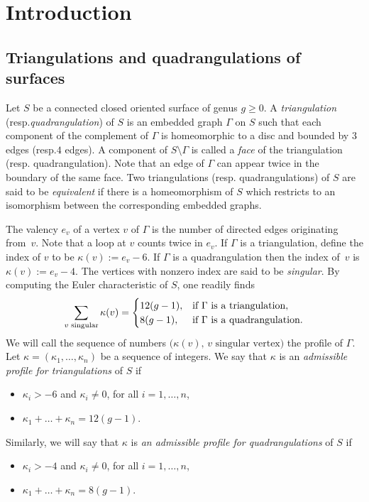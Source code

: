 \documentclass[11pt]{article}
\newcommand{\resp}{resp.\xspace}
\numberwithin{equation}{section}
\theoremstyle{plain}
\theoremstyle{definition}
\let\G\Gamma
\begin{document}
\section{Introduction}\label{sec:intro}
\subsection{Triangulations and quadrangulations of surfaces}\label{sec:triang:quad}
Let $S$ be a connected closed oriented surface of genus $g \geq 0$. A \emph{triangulation} (\resp \emph{quadrangulation}) of $S$ is an embedded graph $\G$ on $S$ such that each component of the complement of $\G$ is homeomorphic to a disc and bounded by $3$ edges (\resp $4$ edges). A component of $S\setminus \G$ is called a \emph{face} of the triangulation (\resp quadrangulation). Note that an edge of $\G$ can appear twice in the boundary of the same face. Two triangulations (\resp quadrangulations) of $S$ are said to be \emph{equivalent} if there is a homeomorphism of $S$ which restricts to an isomorphism between the corresponding embedded graphs.

The valency $e_v$ of a vertex $v$ of $\G$ is the number of directed edges originating from~$v$. Note that a loop at $v$ counts twice in $e_v$. If $\G$ is a triangulation, define the index of $v$ to be $\kappa(v):=e_v-6$. If $\G$ is a quadrangulation then the index of~$v$ is $\kappa(v):=e_v-4$. The vertices with nonzero index are said to be \emph{singular}. By computing the Euler characteristic of $S$, one readily finds
\begin{equation}\label{eq:euler:char}
\sum_{v\text{ singular}}\kappa(v)=
\begin{cases}
12(g-1), & \hbox{if $\G$ is a triangulation}, \\
8(g-1), & \hbox{if $\G$ is a quadrangulation}.
\end{cases}
\end{equation}
We will call the sequence of numbers $\bigl(\kappa(v), \, v \textrm{ singular vertex}\bigr)$ the profile of $\G$.
Let $\kappa=(\kappa_1,\dots,\kappa_n)$ be a sequence of integers.
We say that $\kappa$ is an \emph{admissible profile for triangulations} of $S$ if
\begin{itemize}\renewcommand{\labelitemi}{$\scriptstyle\bullet$}
\item
$\kappa_i>-6$ and $\kappa_i\neq 0$, for all $i=1,\dots,n$,
\item
$\kappa_1+\dots+\kappa_n=12(g-1)$.
\end{itemize}
Similarly, we will say that $\kappa$ is \emph{an admissible profile for quadrangulations} of $S$ if
\begin{itemize}\renewcommand{\labelitemi}{$\scriptstyle\bullet$}
\item
$\kappa_i>-4$ and $\kappa_i\neq 0$, for all $i=1,\dots,n$,
\item
$\kappa_1+\dots+\kappa_n=8(g-1)$.
\end{itemize}
\end{document}
